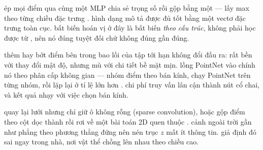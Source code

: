 \documentclass[../../../deep_learning.tex]{subfiles}
\begin{document}
\begin{mach}
\item {} \gp ép mọi điểm qua cùng một MLP chia sẻ trọng số rồi gộp bằng một  --- lấy max theo từng chiều đặc trưng \cite{qi2017pointnet}. \gd hình dạng mô tả được đủ tốt bằng một vectơ đặc trưng toàn cục. \hq bất biến hoán vị ở đây là bất biến \emph{theo cấu trúc}, không phải học được từ , nên nó đúng tuyệt đối chứ không đúng gần đúng.
\item {} \gia thêm hay bớt điểm bên trong bao lồi của tập tới hạn không đổi đầu ra: rất bền với thay đổi mật độ, nhưng mù với chi tiết bề mặt mịn. \gp lồng PointNet vào chính nó theo phân cấp không gian --- nhóm điểm theo bán kính, chạy PointNet trên từng nhóm, rồi lặp lại ở tỉ lệ lớn hơn \cite{qi2017pointnetpp}. \vdm chi phí truy vấn lân cận thành nút cổ chai, và kết quả nhạy với việc chọn bán kính.
\item {} \gp quay lại lưới nhưng chỉ giữ ô không rỗng (sparse convolution), hoặc gộp điểm theo cột dọc thành  rồi rơi về một bài toán 2D quen thuộc \cite{lang2019pointpillars}. \gd cảnh ngoài trời gần như phẳng theo phương thẳng đứng nên nén trục \(z\) mất ít thông tin. \gia giả định đó sai ngay trong nhà, nơi vật thể chồng lên nhau theo chiều cao.
\end{mach}
\end{document}
